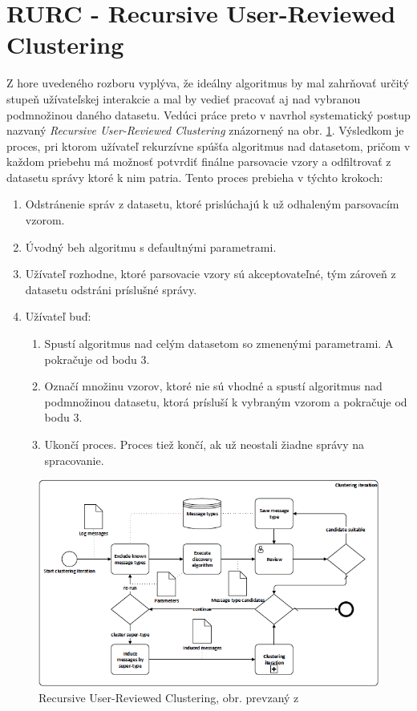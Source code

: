 \section{RURC - Recursive User-Reviewed Clustering}
\label{sec:rurc}
Z hore uvedeného rozboru vyplýva, že ideálny algoritmus by mal zahrňovať určitý stupeň užívateľskej interakcie a mal by vedieť pracovať aj nad vybranou podmnožinou daného datasetu. Vedúci práce preto v \parencite{Tovarnak2017} navrhol systematický postup nazvaný \emph{Recursive User-Reviewed Clustering} znázornený na obr. \ref{fig:rurc}. Výsledkom je proces, pri ktorom užívateľ rekurzívne spúšťa algoritmus nad datasetom, pričom v každom priebehu má možnosť potvrdiť finálne parsovacie vzory a odfiltrovať z datasetu správy ktoré k nim patria. Tento proces prebieha v týchto krokoch:

\begin{enumerate}
  \item Odstránenie správ z datasetu, ktoré prislúchajú k už odhaleným parsovacím vzorom.
  \item Úvodný beh algoritmu s defaultnými parametrami.
  \item Užívateľ rozhodne, ktoré parsovacie vzory sú akceptovateľné, tým zároveň z datasetu odstráni príslušné správy.
  \item Užívateľ buď:
  	\begin{enumerate}
   		 \item Spustí algoritmus nad celým datasetom so zmenenými parametrami. A pokračuje od bodu 3.
   		 \item Označí množinu vzorov, ktoré nie sú vhodné a spustí algoritmus nad podmnožinou datasetu, ktorá prísluší k vybraným vzorom a 				pokračuje od bodu 3.
   		 \item Ukončí proces. Proces tiež končí, ak už neostali žiadne správy na spracovanie.
 	 \end{enumerate}
\end{enumerate}

\begin{figure}[htbp]
 \centering 
 \begin{minipage}{\linewidth}
 	\centering
 	\includegraphics[width=\textwidth]{images/RURC.png} 	
 \end{minipage}
  \caption{Recursive User-Reviewed Clustering, obr. prevzaný z  \parencite{Tovarnak2017}}
  \label{fig:rurc}
\end{figure}


